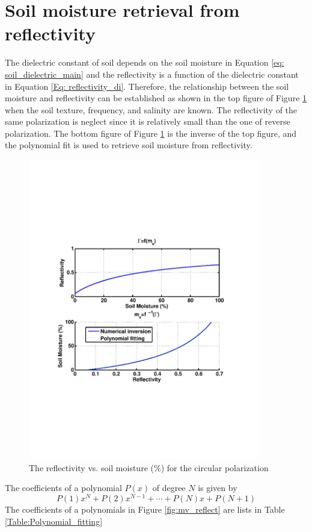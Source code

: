 \documentclass[draftcls]{IEEEtran}
\begin{document}
\section{Soil moisture retrieval from reflectivity}
The dielectric constant of soil depends on the soil moisture in Equation \ref{eq: soil_dielectric_main} and the reflectivity is a function of the dielectric constant in Equation \ref{Eq: reflectivity_di}. Therefore, the relationship between the soil moisture and reflectivity can be established as shown in the top figure of  Figure \ref{fig:reflect_mv} when the soil texture, frequency, and salinity are known. The reflectivity of the same polarization is neglect since it is relatively small than the one of reverse polarization. The bottom figure of Figure \ref{fig:reflect_mv} is the inverse of the top figure, and the polynomial fit is used to retrieve soil moisture from reflectivity.

\begin{figure}[t!]
	\centering
	\includegraphics[width=4in]{pdf/gamma_vs_mv1.pdf}
	\caption{The reflectivity vs. soil moisture ($\%$) for the circular polarization}
	\centering
	\label{fig:reflect_mv}
\end{figure}
 The coefficients of a polynomial $P(x)$ of degree $N$ is given by
 \begin{equation}
	P(1)x^N+P(2)x^{N-1}+\cdots+P(N)x+P(N+1)
\end{equation} The coefficients of a polynomials in Figure \ref{fig:mv_reflect} are lists in Table \ref{Table:Polynomial_fitting}
\end{document}

